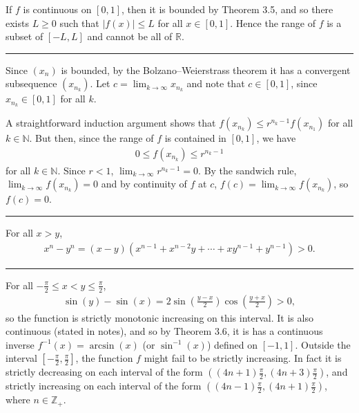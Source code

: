 \documentclass[letterpaper,10pt,english]{jupyterBook}
\begin{document}
If \(f\) is continuous on \([0, 1]\), then it is bounded by Theorem 3.5, and so there exists \(L \geq 0\) such that \(|f(x)| \leq L\) for all \(x \in [0, 1]\). Hence the range of \(f\) is a subset of  \([-L, L]\) and cannot be all of \(\mathbb{R}\).


\bigskip\hrule\bigskip


\sphinxAtStartPar
{\hyperref[\detokenize{Problems:id30}]{}} Since \((x_{n})\) is bounded, by the Bolzano–Weierstrass theorem it has a convergent subsequence \((x_{n_{k}})\). Let \(c=\lim_{k \rightarrow \infty}x_{n_{k}}\) and note that \(c \in [0, 1]\), since \(x_{n_k}\in[0,1]\) for all \(k\).

A straight\sphinxhyphen{}forward induction argument shows that \(f(x_{n_{k}}) \leq r^{n_{k}-1}f(x_{n_{1}})\) for all \(k\in\mathbb{N}\). But then, since the range of \(f\) is contained in \([0,1]\), we have
\begin{equation*}
\begin{split}
0 \leq f(x_{n_{k}}) \leq r^{n_{k}-1}
\end{split}
\end{equation*}
\sphinxAtStartPar
for all \(k\in\mathbb{N}\). Since \(r < 1\), \(\lim_{k\to\infty} r^{n_k-1} =0\). By the sandwich rule, \( \lim_{k \rightarrow \infty}f(x_{n_{k}}) = 0\) and by continuity of \(f\) at \(c\), \(f(c) = \lim_{k \rightarrow \infty}f(x_{n_{k}})\), so \(f(c)=0\).


\bigskip\hrule\bigskip


\sphinxAtStartPar
{\hyperref[\detokenize{Problems:id31}]{}} For all \(x > y\),
\begin{equation*}
\begin{split}
x^{n} - y^{n} = (x - y)(x^{n-1} + x^{n-2}y + \cdots + xy^{n-1} + y^{n-1}) > 0.
\end{split}
\end{equation*}

\bigskip\hrule\bigskip


\sphinxAtStartPar
{\hyperref[\detokenize{Problems:id32}]{}} For all \(-\frac{\pi}{2} \leq x < y \leq \frac{\pi}{2}\),
\begin{equation*}
\begin{split}
\sin(y) - \sin(x) = 2\sin\left(\frac{y - x}{2}\right)\cos\left(\frac{y + x}{2}\right) > 0,
\end{split}
\end{equation*}
\sphinxAtStartPar
so the function is strictly monotonic increasing on this interval. It is also continuous (stated in notes), and so by Theorem 3.6, it is has a continuous inverse \(f^{-1}(x) = \arcsin(x)\) (or \(\sin^{-1}(x)\)) defined on \([-1, 1]\). Outside the interval \(\left[-\frac{\pi}{2}, \frac{\pi}{2}\right]\), the function \(f\) might fail to be strictly increasing. In fact it is strictly decreasing on each interval of the form \(\left((4n+1)\frac{\pi}{2}, (4n + 3)\frac{\pi}{2}\right)\), and strictly increasing on each interval of the form \(\left((4n-1)\frac{\pi}{2}, (4n + 1)\frac{\pi}{2}\right)\), where \(n\in\mathbb{Z}_+\).
\end{document}

